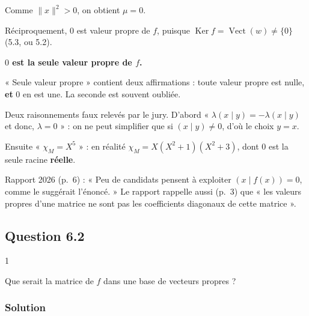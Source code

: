 \documentclass[11pt,a4paper]{article}
\newcommand{\equationajustee}[1]{%
  \sbox{\boiteequation}{$\displaystyle #1$}%
  \ifdim\wd\boiteequation>\linewidth
    \[\resizebox{\linewidth}{!}{\usebox{\boiteequation}}\]%
  \else
    \[#1\]%
  \fi}
\begin{document}
\equationajustee{0=(f(x)\mid x)=\mu\|x\|^2.}

Comme \(\|x\|^2>0\), on obtient \(\mu=0\).

Réciproquement, \(0\) est valeur propre de \(f\), puisque \(\operatorname{Ker}f=\operatorname{Vect}(w)\neq\{0\}\) (5.3, ou 5.2).

\textbf{\(0\) est la seule valeur propre de \(f\).}

\begin{piege}

« Seule valeur propre » contient deux affirmations : toute valeur propre est nulle, \textbf{et} \(0\) en est une. La seconde est souvent oubliée.

\end{piege}

\begin{piege}

Deux raisonnements faux relevés par le jury. D'abord « \(\lambda(x\mid y)=-\lambda(x\mid y)\) et donc, \(\lambda=0\) » : on ne peut simplifier que si \((x\mid y)\neq0\), d'où le choix \(y=x\).

Ensuite « \(\chi_M=X^5\) » : en réalité \(\chi_M=X(X^2+1)(X^2+3)\), dont \(0\) est la seule racine \textbf{réelle}.

\end{piege}

\begin{jury}

Rapport 2026 (p.~6) : « Peu de candidats pensent à exploiter \((x\mid f(x))=0\), comme le suggérait l'énoncé. » Le rapport rappelle aussi (p.~3) que « les valeurs propres d'une matrice ne sont pas les coefficients diagonaux de cette matrice ».

\end{jury}

\hypertarget{question-6.2}{%
\subsection{Question 6.2}\label{question-6.2}}

\begin{indication}{1}

Que serait la matrice de \(f\) dans une base de vecteurs propres ?

\end{indication}

\hypertarget{solution-11}{%
\subsubsection{Solution}\label{solution-11}}
\end{document}
